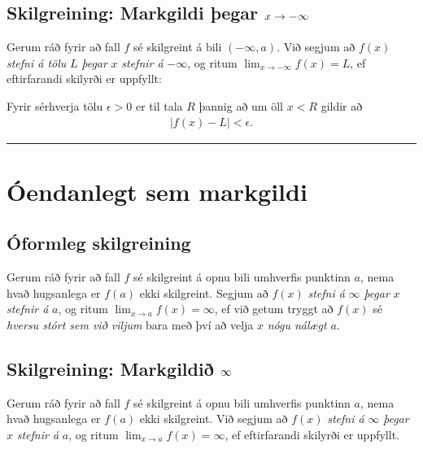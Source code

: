 \documentclass[b5paper,11pt,icelandic]{sphinxmanual}
\begin{document}
\subsection{Skilgreining: Markgildi þegar \protect\(x \to -\infty\protect\)}
\label{kafli02:id6}
Gerum ráð fyrir að fall \(f\) sé skilgreint á bili
\((-\infty,a)\). Við segjum að \(f(x)\) \emph{stefni á tölu}
\(L\) \emph{þegar} \(x\) \emph{stefnir á} \(-\infty\), og ritum
\(\lim_{x\rightarrow -\infty} f(x)=L\), ef eftirfarandi skilyrði er
uppfyllt:

Fyrir sérhverja tölu \(\epsilon>0\) er til tala \(R\)
þannig að um öll \(x<R\) gildir að
\begin{equation*}
\begin{split}|f(x)-L|<\epsilon.\end{split}
\end{equation*}

\bigskip\hrule{}\bigskip



\section{Óendanlegt sem markgildi}
\label{kafli02:oendanlegt-sem-markgildi}

\subsection{Óformleg skilgreining}
\label{kafli02:index-5}\label{kafli02:id7}
Gerum ráð fyrir að fall \(f\) sé skilgreint á opnu bili umhverfis
punktinn \(a\), nema hvað hugsanlega er \(f(a)\) ekki
skilgreint. Segjum að \(f(x)\) \emph{stefni á} \(\infty\) \emph{þegar}
\(x\) \emph{stefnir á} \(a\), og ritum
\(\lim_{x\rightarrow a} f(x)=\infty\), ef við getum tryggt að
\(f(x)\) sé \emph{hversu stórt sem við viljum} bara með því að velja
\(x\) \emph{nógu nálægt} \(a\).


\subsection{Skilgreining: Markgildið \protect\(\infty\protect\)}
\label{kafli02:id8}
Gerum ráð fyrir að fall \(f\) sé skilgreint á opnu bili umhverfis
punktinn \(a\), nema hvað hugsanlega er \(f(a)\) ekki
skilgreint. Við segjum að \(f(x)\) \emph{stefni á} \(\infty\) \emph{þegar}
\(x\) \emph{stefnir á} \(a\), og ritum
\(\lim_{x\rightarrow a} f(x)=\infty\), ef eftirfarandi skilyrði er
uppfyllt.
\end{document}
